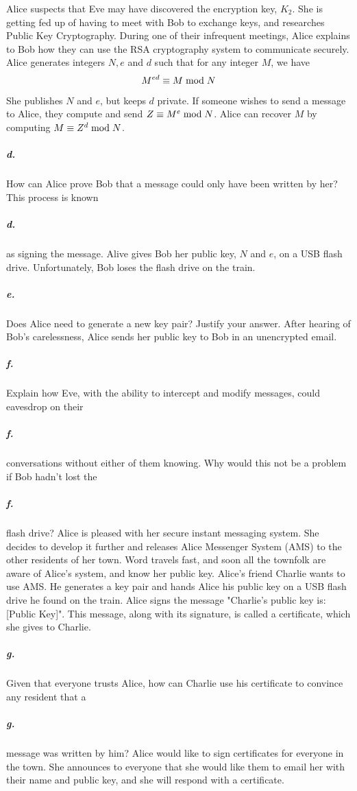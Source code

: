 \documentclass[11pt]{article}
\newcommand{\mm}[1]{\hspace{#1mm}}
\newcommand{\pnewline}[1]{\vspace*{-\baselineskip}\subparagraph*{{\color{white} #1}}}
\begin{document}
{Alice suspects that Eve may have discovered the encryption key, $K_2$. She is getting fed up of having to meet with Bob to exchange keys, and researches Public Key Cryptography.\newline\newline
During one of their infrequent meetings, Alice explains to Bob how they can use the RSA cryptography system to communicate securely. Alice generates integers $N , e$ and $d$ such that for any integer $M$, we have 
$$M^{ed} \equiv M\mm{1} \text{mod}\mm{1} N$$
She publishes $N$ and $e$, but keeps $d$ private. If someone wishes to send a message to Alice, they compute and send $Z \equiv M^e \mm{1} \text{mod} \mm{1} N$. Alice can recover $M$ by computing $M \equiv Z^d \mm{1} \text{mod} \mm{1} N$.
\subparagraph*{d.} How can Alice prove Bob that a message could only have been written by her? This process is known\pnewline{d.} as signing the message.\newline\newline
Alive gives Bob her public key, $N$ and $e$, on a USB flash drive. Unfortunately, Bob loses the flash drive on the train. 
\subparagraph*{e.} Does Alice need to generate a new key pair? Justify your answer.
After hearing of Bob's carelessness, Alice sends her public key to Bob in an unencrypted email.
\subparagraph*{f.} Explain how Eve, with the ability to intercept and modify messages, could eavesdrop on their \pnewline{f.} conversations without either of them knowing. Why would this not be a problem if Bob hadn't lost the \pnewline{f.} flash drive? \newline\newline
Alice is pleased with her secure instant messaging system. She decides to develop it further and releases Alice Messenger System (AMS) to the other residents of her town. Word travels fast, and soon all the townfolk are aware of Alice's system, and know her public key. \newline\newline
Alice's friend Charlie wants to use AMS. He generates a key pair and hands Alice his public key on a USB flash drive he found on the train. Alice signs the message "Charlie's public key is: [Public Key]". This message, along with its signature, is called a certificate, which she gives to Charlie.
\subparagraph*{g.} Given that everyone trusts Alice, how can Charlie use his certificate to convince any resident that a \pnewline{g.} message was written by him? \newline
Alice would like to sign certificates for everyone in the town. She announces to everyone that she would like them to email her with their name and public key, and she will respond with a certificate.
}
\end{document}
